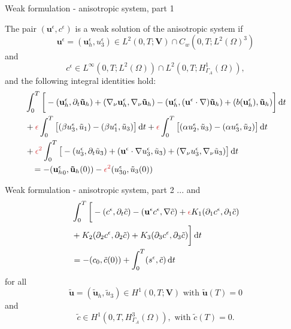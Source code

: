 \documentclass{beamer}
\newcommand*\diff{\mathop{}\!\mathrm{d}}
\begin{document}
\begin{frame}{Weak formulation - anisotropic system, part 1}

The pair $(\mathbf{u}^\epsilon, c^\epsilon)$ is a weak solution of the anisotropic system if
$$\mathbf{u}^\epsilon = (\mathbf{u}^\epsilon_h, u^\epsilon_3) \in L^2 (0,T ; \mathbf{V}) \cap C_w (0, T; L^2 (\Omega)^3)$$
and
$$c^\epsilon \in L^\infty (0,T; L^2(\Omega)) \cap L^2 (0,T; H^1_{\Gamma_A}(\Omega)),$$ and the following integral identities hold:
%
\begin{equation} \nonumber
\begin{split}
& \int_0^T \bigg [ -(\mathbf{u}^\epsilon_h, \partial_t \mathbf{\tilde{u}}_h) + (\nabla_\nu \mathbf{u}^\epsilon_h, \nabla_\nu \mathbf{\tilde{u}}_h) - (\mathbf{u}^\epsilon_h, (\mathbf{u}^\epsilon \cdot \nabla) \mathbf{\tilde{u}}_h) + (b(\mathbf{u}^\epsilon_h), \mathbf{\tilde{u}}_h) \bigg ] \diff t \\
& + \textcolor{jasper}{\epsilon} \int_0 ^ T \big [ (\beta u_3 ^\epsilon, \tilde{u}_1) - (\beta u_1^\epsilon, \tilde{u}_3) \big ] \diff t + \textcolor{jasper}{\epsilon} \int_0 ^ T \big [ (\alpha u_2 ^\epsilon, \tilde{u}_3) - (\alpha u_3^\epsilon, \tilde{u}_2) \big ] \diff t\\
& + \textcolor{jasper}{\epsilon^2} \int _0 ^ T \big [ -(u_3^\epsilon, \partial_t \tilde{u}_3) +(\mathbf{u}^\epsilon \cdot \nabla u_3 ^ \epsilon, \tilde{u}_3) + (\nabla_\nu u_3^\epsilon, \nabla_\nu \tilde{u}_3) \big ] \diff t \\
& \hspace{0.3cm} = - ({\mathbf{u}^\epsilon_h}_0, \mathbf{\tilde{u}}_h(0)) - \textcolor{jasper}{\epsilon^2} ({u^\epsilon_3}_0, \tilde{u}_3 (0))
\end{split}
\end{equation}

\end{frame}

\begin{frame}{Weak formulation - anisotropic system, part 2}
 ... and
\begin{equation}
\begin{split} \nonumber
& \int_0^T \bigg [ -(c^\epsilon, \partial_t \tilde{c}) -(\mathbf{u}^\epsilon c^\epsilon, \nabla \tilde{c}) + \textcolor{jasper}{\epsilon} K_1 (\partial_1 c^\epsilon, \partial_1 \tilde{c}) \\
& + K_2 (\partial_2 c^\epsilon, \partial_2 \tilde{c}) + K_3 (\partial_3 c^\epsilon, \partial_3 \tilde{c}) \bigg ] \diff t \\
& =  - (c_0, \tilde{c} (0)) + \int_0^T (s^\epsilon,\tilde{c}) \diff t
\end{split}
\end{equation}
%
for all $$\mathbf{\tilde{u}} = (\mathbf{\tilde{u}}_h, \tilde{u}_3) \in H^1 (0,T;\mathbf{V}) \text{ with } \mathbf{\tilde{u}}(T) = 0$$
and
$$ \tilde{c} \in H^1 (0,T, H^3_{\Gamma_A} (\Omega)), \text{ with } \tilde{c} (T) = 0.$$

\end{frame}
\end{document}
